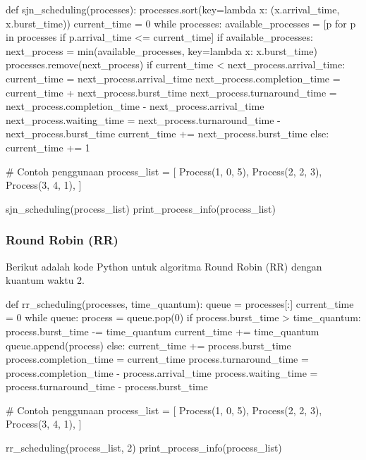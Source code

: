 \documentclass[12pt]{article}
\begin{document}
\begin{python}[language=Python, caption=Kode Python untuk penjadwalan SJN]
def sjn_scheduling(processes):
    processes.sort(key=lambda x: (x.arrival_time, x.burst_time))
    current_time = 0
    while processes:
        available_processes = [p for p in processes if p.arrival_time <= current_time]
        if available_processes:
            next_process = min(available_processes, key=lambda x: x.burst_time)
            processes.remove(next_process)
            if current_time < next_process.arrival_time:
                current_time = next_process.arrival_time
            next_process.completion_time = current_time + next_process.burst_time
            next_process.turnaround_time = next_process.completion_time - next_process.arrival_time
            next_process.waiting_time = next_process.turnaround_time - next_process.burst_time
            current_time += next_process.burst_time
        else:
            current_time += 1

# Contoh penggunaan
process_list = [
    Process(1, 0, 5),
    Process(2, 2, 3),
    Process(3, 4, 1),
]

sjn_scheduling(process_list)
print_process_info(process_list)
\end{python}

\subsubsection{Round Robin (RR)}
Berikut adalah kode Python untuk algoritma Round Robin (RR) dengan kuantum waktu 2.

\begin{python}[language=Python, caption=Kode Python untuk penjadwalan Round Robin (RR)]
def rr_scheduling(processes, time_quantum):
    queue = processes[:]
    current_time = 0
    while queue:
        process = queue.pop(0)
        if process.burst_time > time_quantum:
            process.burst_time -= time_quantum
            current_time += time_quantum
            queue.append(process)
        else:
            current_time += process.burst_time
            process.completion_time = current_time
            process.turnaround_time = process.completion_time - process.arrival_time
            process.waiting_time = process.turnaround_time - process.burst_time

# Contoh penggunaan
process_list = [
    Process(1, 0, 5),
    Process(2, 2, 3),
    Process(3, 4, 1),
]

rr_scheduling(process_list, 2)
print_process_info(process_list)
\end{python}
\end{document}
